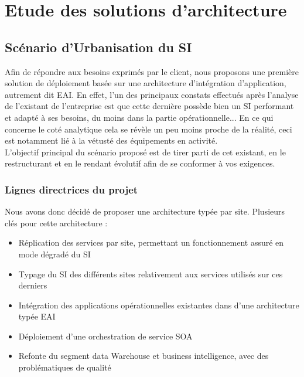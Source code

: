 \section{Etude des solutions d'architecture}

\subsection{Scénario d'Urbanisation du SI}

Afin de répondre aux besoins exprimés par le client, nous proposons une première solution de déploiement basée sur une architecture d'intégration d'application, autrement dit EAI. 
En effet, l'un des principaux constats effectués après l'analyse de l'existant de l'entreprise est que cette dernière possède bien un SI performant et adapté à ses besoins, du moins dans la partie opérationnelle... En ce qui concerne le coté analytique cela se révèle un peu moins proche de la réalité, ceci est notamment lié à la vétusté des équipements en activité.\\ 
L'objectif principal du scénario proposé est de tirer parti de cet existant, en le restructurant et en le rendant évolutif afin de se conformer à vos exigences.

\subsubsection{Lignes directrices du projet}

Nous avons donc décidé de proposer une architecture typée par site. Plusieurs clés pour cette architecture :\\

\begin{itemize}
\item Réplication des services par site, permettant un fonctionnement assuré en mode dégradé du SI
\item Typage du SI des différents sites relativement aux services utilisés sur ces derniers
\item Intégration des applications opérationnelles existantes dans d'une architecture typée EAI
\item Déploiement d'une orchestration de service SOA
\item Refonte du segment data Warehouse et business intelligence, avec des problématiques de qualité\\
\end{itemize}

